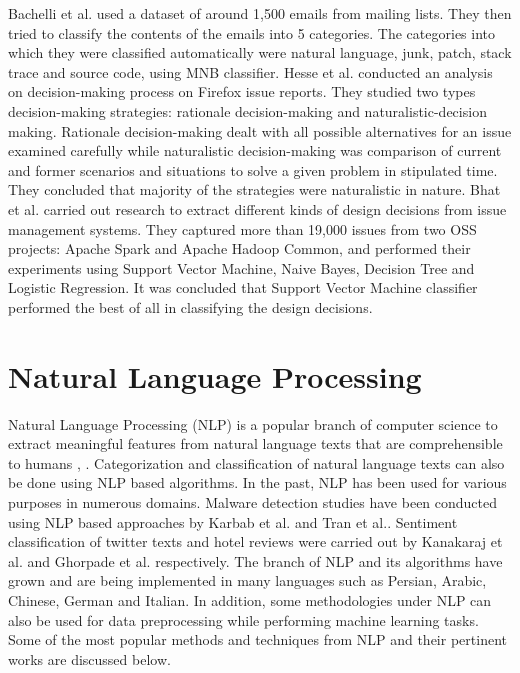 \documentclass[a4paper,12pt,twoside]{report}
\begin{document}
\newline \newline
Bachelli et al.\cite{Bacchelli2012} used a dataset of around 1,500 emails from mailing lists. They then tried to classify the contents of the emails into 5 categories. The categories into which they were classified automatically were natural language, junk, patch, stack trace and source code, using MNB classifier. 
\newline \newline
Hesse et al.\cite{Hesse2016} conducted an analysis on decision-making process on Firefox issue reports. They studied two types decision-making strategies: rationale decision-making and naturalistic-decision making. Rationale decision-making dealt with all possible alternatives for an issue examined carefully while naturalistic decision-making was comparison of current and former scenarios and situations to solve a given problem in stipulated time. They concluded that majority of the strategies were naturalistic in nature. 
\newline \newline
Bhat et al.\cite{Bhat2017} carried out research to extract different kinds of design decisions from issue management systems. They captured more than 19,000 issues from two OSS projects: Apache Spark and Apache Hadoop Common, and performed their experiments using Support Vector Machine, Naive Bayes, Decision Tree and Logistic Regression. It was concluded that Support Vector Machine classifier performed the best of all in classifying the design decisions. 


\section{Natural Language Processing}

Natural Language Processing (NLP) is a popular branch of computer science to extract meaningful features from natural language texts that are comprehensible to humans \cite{Al-ghamdi2017}, \cite{Suhaimin2017}. Categorization and classification of natural language texts can also be done using NLP based algorithms. In the past, NLP has been used for various purposes in numerous domains. Malware detection studies have been conducted using NLP based approaches by Karbab et al. \cite{Karbab2017} and Tran et al.\cite{Tran2017}. Sentiment classification of twitter texts and hotel reviews were carried out by Kanakaraj et al.\cite{Kanakaraj2015} and Ghorpade et al.\cite{Ghorpade2012} respectively. The branch of NLP and its algorithms have grown and are being implemented in many languages such as Persian\cite{Ri}, Arabic\cite{Abuleil2007}, Chinese\cite{Liu2008}, German\cite{Metzmacher2017} and Italian\cite{Damiano2017}. 
\newline \newline
In addition, some methodologies under NLP can also be used for data preprocessing while performing machine learning tasks. Some of the most popular methods and techniques from NLP and their pertinent works are discussed below. 
\end{document}
